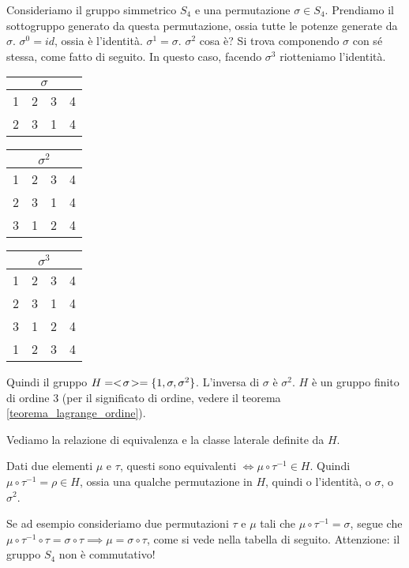 \begin{exmp}
Consideriamo il gruppo simmetrico $S_4$ e una permutazione $\sigma \in S_4$. Prendiamo il sottogruppo generato da questa permutazione, ossia tutte le potenze generate da $\sigma$. $\sigma^{0} = id$, ossia \`e l'identit\`a. $\sigma^{1} = \sigma$. $\sigma^{2}$ cosa \`e? Si trova componendo $\sigma$ con s\'e stessa, come fatto di seguito. In questo caso, facendo $\sigma^{3}$ riotteniamo l'identit\`a.

\begin{center}
\begin{tabular}{cccc}
\multicolumn{4}{c}{$\sigma$} \\
\hline
1 & 2 & 3 & 4 \\
2 & 3 & 1 & 4 
\end{tabular}
\qquad
\begin{tabular}{cccc}
\multicolumn{4}{c}{$\sigma^{2}$} \\
\hline
1 & 2 & 3 & 4 \\
2 & 3 & 1 & 4 \\
3 & 1 & 2 & 4
\end{tabular}
\qquad
\begin{tabular}{cccc}
\multicolumn{4}{c}{$\sigma^{3}$} \\
\hline
1 & 2 & 3 & 4 \\
2 & 3 & 1 & 4 \\
3 & 1 & 2 & 4 \\
1 & 2 & 3 & 4 
\end{tabular}
\end{center}

Quindi il gruppo $H = <\!{\sigma}\!> = \{ 1 , \sigma, \sigma^{2} \}$. L'inversa di $\sigma$ \`e $\sigma^{2}$. $H$ \`e un gruppo finito di ordine 3 (per il significato di ordine, vedere il teorema \ref{teorema_lagrange_ordine}).

Vediamo la relazione di equivalenza e la classe laterale definite da $H$.

Dati due elementi $\mu$  e $\tau$, questi sono equivalenti $ \iff \mu \circ \tau^{-1} \in H$. Quindi $\mu \circ \tau^{-1} = \rho \in H$, ossia una qualche permutazione in $H$, quindi o l'identit\`a, o $\sigma$, o $\sigma^{2}$.

Se ad esempio consideriamo due permutazioni $\tau$ e $\mu$ tali che $\mu \circ \tau^{-1} = \sigma$, segue che $\mu \circ \tau^{-1} \circ \tau = \sigma \circ \tau \implies \mu = \sigma \circ \tau$, come si vede nella tabella di seguito. Attenzione: il gruppo $S_4$ non \`e commutativo!


\end{exmp}
